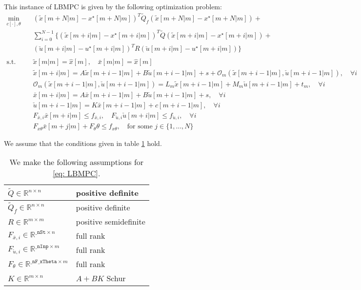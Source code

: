 \documentclass[letter]{article}
\begin{document}
\begin{sffamily}
\noindent
This instance of LBMPC is given by the following optimization problem:
\begin{align}\label{eq: LBMPC}
	\min_{c[\cdot],\theta} \quad & (\tilde{x}[m+N|m]-x^\star[m+N|m])^T \tilde{Q}_f (\tilde{x}[m+N|m]-x^\star[m+N|m]) + \\
	&  \sum_{i=0} ^ {N-1} \{ (\tilde{x}[m+i|m]-x^\star[m+i|m])^T \tilde{Q} (\tilde{x}[m+i|m]-x^\star[m+i|m]) + \nonumber \\
	& (\check{u}[m+i|m]-u^\star[m+i|m])^T R (\check{u}[m+i|m]-u^\star[m+i|m]) \}  \nonumber \\	
		\nonumber \\		
	\text{s.t.} \quad & \tilde{x}[m|m] = \hat{x}[m],\quad \bar{x}[m|m] = \hat{x}[m] \nonumber \\
		&  \tilde{x}[m+i|m]= A \tilde{x}[m+i-1|m] + B \check{u}[m+i-1|m] + s + \mathcal{O}_m(\tilde{x}[m+i-1|m],\check{u}[m+i-1|m]), \quad \forall i \nonumber\\
		& \mathcal{O}_m(\tilde{x}[m+i-1|m],\check{u}[m+i-1|m]) = L_m \tilde{x}[m+i-1|m] + M_m \check{u}[m+i-1|m] + t_m, \quad \forall i \nonumber \\
	 &	\bar{x}[m+i|m]= A \bar{x}[m+i-1|m] + B \check{u}[m+i-1|m]+s, \quad \forall i \nonumber\\
	 & \check{u}[m+i-1|m] = K\bar{x}[m+i-1|m] + c[m+i-1|m], \quad \forall i \nonumber \\
	 & F_{\bar{x},i}\bar{x}[m+i|m] \leq f_{\bar{x},i}, \quad F_{\check{u},i}\check{u}[m+i|m] \leq f_{\check{u},i}, \quad \forall i \nonumber \\
	 & F_{x\theta}\bar{x}[m+j|m] + F_\theta \theta \leq f_{x\theta},\quad \text{for some } j\in\{1,\ldots, N\} \nonumber
\end{align}

\noindent
We assume that the conditions given in table \ref{tab: matrix assumptions} hold. \\

\begin{table}[!htdp]
\caption{We make the following assumptions for \eqref{eq: LBMPC}.}
\begin{center}
\begin{tabular}{|l|l|}\hline
 $\tilde{Q}\in\mathbb{R}^{n\times n}$ & positive definite\\ \hline
 $\tilde{Q}_f\in\mathbb{R}^{n\times n}$ & positive definite\\ \hline
 $R\in\mathbb{R}^{m\times m}$ & positive semidefinite \\ \hline
 $F_{\bar{x},i}\in\mathbb{R}^{\texttt{\_nSt}\times n}$ & full rank \\ \hline
 $F_{\check{u},i}\in\mathbb{R}^{\texttt{\_nInp}\times m}$ & full rank \\ \hline
 $F_\theta\in\mathbb{R}^{\texttt{\_nF\_xTheta}\times m}$ & full rank \\ \hline
 $K\in\mathbb{R}^{m\times n}$ & $A+BK$ Schur \\ \hline
\end{tabular}
\end{center}
\label{tab: matrix assumptions}
\end{table}



\end{sffamily}
\end{document}
